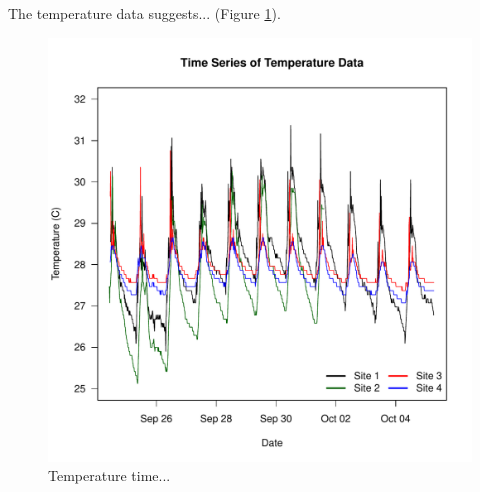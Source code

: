 \documentclass{article}\usepackage[]{graphicx}\usepackage[]{color}
\begin{document}
The temperature data suggests... (Figure \ref{Temp}).

\begin{figure}
\includegraphics{Figures/Temp}
\caption{Temperature time...}
\label{Temp}
\end{figure}
\end{document}
